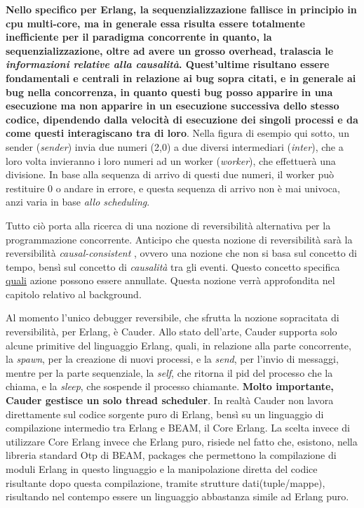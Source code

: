 \documentclass[Tesi.tex]{subfiles}
\begin{document}
\textbf{Nello specifico per Erlang, la sequenzializzazione fallisce in principio in cpu multi-core, ma in generale essa risulta essere totalmente inefficiente per il paradigma concorrente in quanto, la sequenzializzazione, oltre ad avere un grosso overhead, tralascia le \textit{informazioni relative alla causalità}. Quest'ultime risultano essere fondamentali e centrali in relazione ai bug sopra citati, e in generale ai bug nella concorrenza, in quanto questi bug posso apparire in una esecuzione ma non apparire in un esecuzione successiva dello stesso codice, dipendendo dalla velocità di esecuzione dei singoli processi e da come questi interagiscano tra di loro}.
Nella figura di esempio qui sotto, un sender (\textit{sender}) invia due numeri (2,0) a due diversi intermediari (\textit{inter}), che a loro volta invieranno i loro numeri ad un worker (\textit{worker}), che effettuerà una divisione. In base alla sequenza di arrivo di questi due numeri, il worker può restituire 0 o andare in errore, e questa sequenza di arrivo non è mai univoca, anzi varia in base \textit{allo scheduling}.

Tutto ciò porta alla ricerca di una nozione di reversibilità alternativa per la programmazione concorrente.
Anticipo che questa nozione di reversibilità sarà la reversibilità \textit{causal-consistent} \cite{causal}, ovvero una nozione che non si basa sul concetto di tempo, bensì sul concetto di \textit{causalità} tra gli eventi.
Questo concetto specifica \underline{quali} azione possono essere annullate.
Questa nozione verrà approfondita nel capitolo relativo al background.

Al momento l'unico debugger reversibile, che sfrutta la nozione sopracitata di reversibilità, per Erlang, è Cauder\cite{github}.
Allo stato dell'arte, Cauder supporta solo alcune primitive del linguaggio Erlang, quali, in relazione alla parte concorrente, la \textit{spawn}, per la creazione di nuovi processi, e la \textit{send}, per l'invio di messaggi, mentre per la parte sequenziale, la \textit{self}, che ritorna il pid del processo che la chiama, e la \textit{sleep}, che sospende il processo chiamante.
\textbf{Molto importante, Cauder gestisce un solo thread scheduler}.
In realtà Cauder non lavora direttamente sul codice sorgente puro di Erlang, bensì su un linguaggio di compilazione intermedio tra Erlang e BEAM, il Core Erlang\cite{coreErlang}.
La scelta invece di utilizzare Core Erlang invece che Erlang puro, risiede nel fatto che, esistono, nella libreria standard Otp di BEAM, packages che permettono la compilazione di moduli Erlang in questo linguaggio e la manipolazione diretta del codice risultante dopo questa compilazione, tramite strutture dati(tuple/mappe), risultando nel contempo essere un linguaggio abbastanza simile ad Erlang puro.
\end{document}
